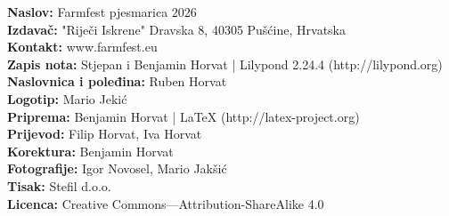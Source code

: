 \begin{center}
\vspace*{\fill}
\begin{onehalfspacing}
\textbf{Naslov:} Farmfest pjesmarica 2026\\
\vspace{\impresspac}
\textbf{Izdavač:} "Riječi Iskrene" Dravska 8, 40305 Pušćine, Hrvatska\\
\vspace{\impresspac}
\textbf{Kontakt:} www.farmfest.eu\\
\vspace{\impresspac}
\textbf{Zapis nota:} Stjepan i Benjamin Horvat | Lilypond 2.24.4 (http://lilypond.org)\\
\vspace{\impresspac}
\textbf{Naslovnica i poleđina:} Ruben Horvat\\
\vspace{\impresspac}
\textbf{Logotip:} Mario Jekić\\
\vspace{\impresspac}
\textbf{Priprema:} Benjamin Horvat | LaTeX (http://latex-project.org)\\
\vspace{\impresspac}
\textbf{Prijevod:} Filip Horvat, Iva Horvat\\
\vspace{\impresspac}
\textbf{Korektura:} Benjamin Horvat\\
\vspace{\impresspac}
\textbf{Fotografije:} Igor Novosel, Mario Jakšić\\
\vspace{\impresspac}
\textbf{Tisak:} Stefil d.o.o.\\
\vspace{\impresspac}
\textbf{Licenca:} Creative Commons—Attribution-ShareAlike 4.0\\
\vspace{\impresspac}
\vspace{\impresspac}
\vspace{\impresspac}
\vspace{\impresspac}

\end{onehalfspacing}
\end{center}

